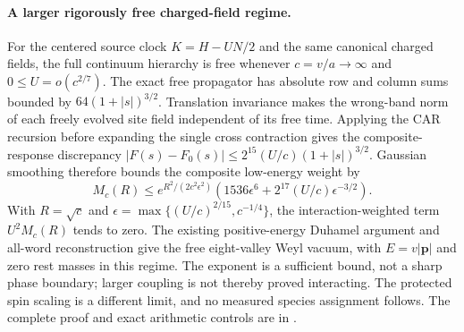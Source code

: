 \paragraph{A larger rigorously free charged-field regime.}
For the centered source clock $K=H-UN/2$ and the same canonical charged
fields, the full continuum hierarchy is free whenever
$c=v/a\to\infty$ and $0\le U=o(c^{2/7})$.
The exact free propagator has absolute row and column sums bounded by
$64(1+|s|)^{3/2}$. Translation invariance makes the wrong-band norm of
each freely evolved site field independent of its free time. Applying
the CAR recursion before expanding the single cross contraction gives
the composite-response discrepancy
$|F(s)-F_0(s)|\le 2^{15}(U/c)(1+|s|)^{3/2}$.
Gaussian smoothing therefore bounds the composite low-energy weight by
\[
 M_c(R)\le e^{R^2/(2c^2\epsilon^2)}
 \left(1536\epsilon^6+2^{17}(U/c)\epsilon^{-3/2}\right).
\]
With $R=\sqrt c$ and
$\epsilon=\max\{(U/c)^{2/15},c^{-1/4}\}$, the interaction-weighted
term $U^2M_c(R)$ tends to zero. The existing positive-energy Duhamel
argument and all-word reconstruction give the free eight-valley Weyl
vacuum, with $E=v|\mathbf p|$ and zero rest masses in this regime.
The exponent is a sufficient bound, not a sharp phase boundary;
larger coupling is not thereby proved interacting. The protected spin
scaling is a different limit, and no measured species assignment follows.
The complete proof and exact arithmetic controls are in
.
